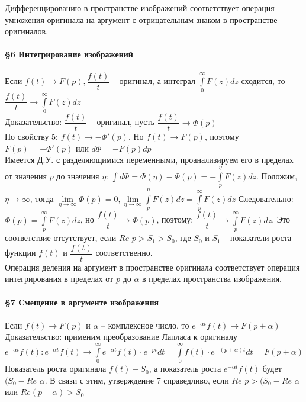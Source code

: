 \documentclass{article}
\numberwithin{equation}{section}
\begin{document}
Дифференцированию в пространстве изображений соответствует операция умножения оригинала на аргумент с отрицательным знаком в пространстве оригиналов.
\\\\
\textbf{\large{\S6 Интегрирование изображений}}
\\\\
Если $f(t)\rightarrow F(p),\dfrac{f(t)}{t}$ -- оригинал, а интеграл $\int\limits_0^\infty F(z)dz$ сходится, то $\dfrac{f(t)}{t}\rightarrow\int\limits_0^\infty F(z)dz$\\
Доказательство: $\dfrac{f(t)}{t}$ -- оригинал, пусть $\dfrac{f(t)}{t}\rightarrow\varPhi(p)$\\
По свойству 5: $f(t)\rightarrow-\varPhi'(p)$. Но $f(t)\rightarrow F(p)$, поэтому $F(p)=-\varPhi'(p)$ или $d\varPhi=-F(p)dp$\\
Имеется Д.У. с разделяющимися переменными, проанализируем его в пределах от значения $p$ до значения $\eta$: $\int d\varPhi=\varPhi(\eta)-\varPhi(p)=-\int\limits_p^\eta F(z)dz$. Положим, $\eta\rightarrow\infty$, тогда $\lim\limits_{\eta\rightarrow\infty}\varPhi(p)=0,\lim\limits_{\eta\rightarrow\infty}\int\limits_p^\eta F(z)dz=\int\limits_p^\infty F(z)dz$ Следовательно: $\varPhi(p)=\int\limits_p^\infty F(z)dz$, но $\dfrac{f(t)}{t}\rightarrow\varPhi(p)$, поэтому: $\dfrac{f(t)}{t}\rightarrow\int\limits_p^\infty F(z)dz$. Это соответствие отсутствует, если $Re$ $p>S_1>S_0$, где $S_0$ и $S_1$ -- показатели роста функции $f(t)$ и $\dfrac{f(t)}{t}$ соответственно.\\
Операция деления на аргумент в пространстве оригинала соответствует операция интегрирования в пределах от $p$ до $\alpha$ в пределах пространства изображения.
\\\\
\textbf{\large{\S7 Смещение в аргументе изображения}}
\\\\
Если $f(t)\rightarrow F(p)$ и $\alpha$ -- комплексное число, то $e^{-\alpha t}f(t)\rightarrow F(p+\alpha)$\\
Доказательство: применим преобразование Лапласа к оригиналу $e^{-\alpha t}f(t):e^{-\alpha t}f(t)\rightarrow\int\limits_0^\infty e^{-\alpha t}f(t)\cdot e^{-pt}dt=\int\limits_0^\infty f(t)\cdot e^{-(p+\alpha)t}dt=F(p+\alpha)$\\
Показатель роста оригинала $f(t)-S_0$, а показатель роста $e^{-\alpha t}f(t)$ будет $(S_0-Re$ $\alpha$. В связи с этим, утверждение 7 справедливо, если $Re$ $p>(S_0-Re$ $\alpha$ или $Re(p+\alpha)>S_0$
\\\\
\end{document}
